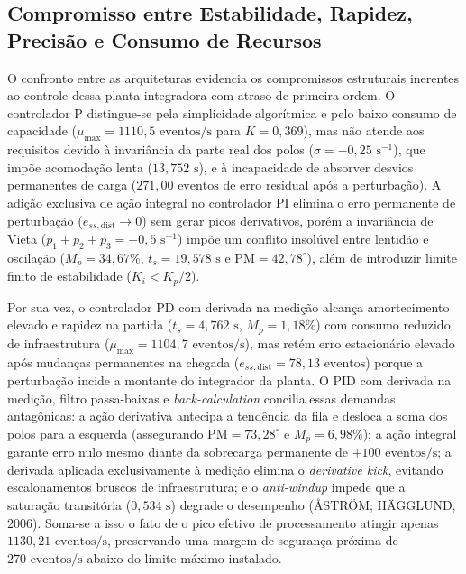 \subsection{Compromisso entre Estabilidade, Rapidez, Precisão e Consumo de Recursos}\label{sec:tradeoffs}
O confronto entre as arquiteturas evidencia os compromissos estruturais inerentes ao controle dessa planta integradora com atraso de primeira ordem. O controlador P distingue-se pela simplicidade algorítmica e pelo baixo consumo de capacidade ($\mu_{\max}=1110{,}5\text{ eventos/s}$ para $K=0{,}369$), mas não atende aos requisitos devido à invariância da parte real dos polos ($\sigma = -0{,}25\text{ s}^{-1}$), que impõe acomodação lenta ($13{,}752\text{ s}$), e à incapacidade de absorver desvios permanentes de carga ($271{,}00\text{ eventos}$ de erro residual após a perturbação). A adição exclusiva de ação integral no controlador PI elimina o erro permanente de perturbação ($e_{ss,\text{dist}} \to 0$) sem gerar picos derivativos, porém a invariância de Vieta ($p_1+p_2+p_3=-0{,}5\text{ s}^{-1}$) impõe um conflito insolúvel entre lentidão e oscilação ($M_p = 34{,}67\%$, $t_s = 19{,}578\text{ s}$ e $\mathrm{PM} = 42{,}78^\circ$), além de introduzir limite finito de estabilidade ($K_i < K_p/2$).

Por sua vez, o controlador PD com derivada na medição alcança amortecimento elevado e rapidez na partida ($t_s = 4{,}762\text{ s}$, $M_p = 1{,}18\%$) com consumo reduzido de infraestrutura ($\mu_{\max} = 1104{,}7\text{ eventos/s}$), mas retém erro estacionário elevado após mudanças permanentes na chegada ($e_{ss,\text{dist}} = 78{,}13\text{ eventos}$) porque a perturbação incide a montante do integrador da planta. O PID com derivada na medição, filtro passa-baixas e \textit{back-calculation} concilia essas demandas antagônicas: a ação derivativa antecipa a tendência da fila e desloca a soma dos polos para a esquerda (assegurando $\mathrm{PM} = 73{,}28^\circ$ e $M_p = 6{,}98\%$); a ação integral garante erro nulo mesmo diante da sobrecarga permanente de $+100\text{ eventos/s}$; a derivada aplicada exclusivamente à medição elimina o \textit{derivative kick}, evitando escalonamentos bruscos de infraestrutura; e o \textit{anti-windup} impede que a saturação transitória ($0{,}534\text{ s}$) degrade o desempenho (ÅSTRÖM; HÄGGLUND, 2006). Soma-se a isso o fato de o pico efetivo de processamento atingir apenas $1130{,}21\text{ eventos/s}$, preservando uma margem de segurança próxima de $270\text{ eventos/s}$ abaixo do limite máximo instalado.

